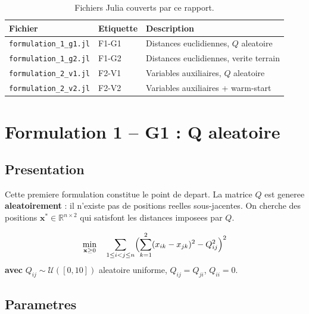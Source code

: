 \documentclass[12pt,a4paper]{article}
\begin{document}
\vspace{6pt}
\begin{table}[H]
\centering
\begin{tabularx}{\linewidth}{llX}
\toprule
\textbf{Fichier} & \textbf{Etiquette} & \textbf{Description} \\
\midrule
\texttt{formulation\_1\_g1.jl} & F1-G1 & Distances euclidiennes, $Q$ aleatoire \\
\texttt{formulation\_1\_g2.jl} & F1-G2 & Distances euclidiennes, verite terrain \\
\texttt{formulation\_2\_v1.jl} & F2-V1 & Variables auxiliaires, $Q$ aleatoire \\
\texttt{formulation\_2\_v2.jl} & F2-V2 & Variables auxiliaires + warm-start \\
\bottomrule
\end{tabularx}
\caption{Fichiers Julia couverts par ce rapport.}
\end{table}

\newpage

\section{Formulation 1 -- G1 : Q aleatoire}

\subsection{Presentation}

Cette premiere formulation constitue le point de depart.
La matrice $Q$ est generee \textbf{aleatoirement} : il n'existe pas de
positions reelles sous-jacentes.  On cherche des positions
$\mathbf{x}^* \in \mathbb{R}^{n \times 2}$ qui satisfont les distances
imposees par $Q$.

\begin{objetifbox}
\[
  \min_{\mathbf{x} \geq 0} \quad
  \sum_{1 \le i < j \le n}
  \Bigl(
    \sum_{k=1}^{2} (x_{ik} - x_{jk})^2 - Q_{ij}^2
  \Bigr)^2
\]
\textbf{avec} $Q_{ij} \sim \mathcal{U}([0,10])$ aleatoire uniforme,
$Q_{ij}=Q_{ji}$, $Q_{ii}=0$.
\end{objetifbox}

\subsection{Parametres}
\end{document}
